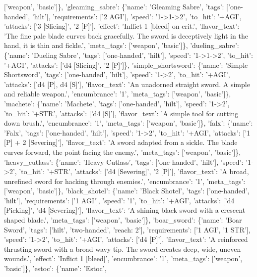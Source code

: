 \documentclass[
  letterpaper,
  DIV=11,
  numbers=noendperiod]{scrartcl}
\begin{document}
{{[}'weapon', 'basic'{]}\}, 'gleaming\_sabre': \{'name': 'Gleaming
Sabre', 'tags': {[}'one-handed', 'hilt'{]}, 'requirements': {[}'2
AGI'{]}, 'speed': '1-\textgreater1-\textgreater2', 'to\_hit': '+AGI',
'attacks': {[}'3 {[}Slicing{]}', '2 {[}P{]}'{]}, 'effect': 'Inflict 1
{[}bleed{]} on crit.', 'flavor\_text': 'The fine pale blade curves back
gracefully. The sword is deceptively light in the hand, it is thin and
fickle.', 'meta\_tags': {[}'weapon', 'basic'{]}\}, 'dueling\_sabre':
\{'name': 'Dueling Sabre', 'tags': {[}'one-handed', 'hilt'{]}, 'speed':
'1-\textgreater1-\textgreater2', 'to\_hit': '+AGI', 'attacks': {[}'d4
{[}Slicing{]}', '2 {[}P{]}'{]}\}, 'simple\_shortsword': \{'name':
'Simple Shortsword', 'tags': {[}'one-handed', 'hilt'{]}, 'speed':
'1-\textgreater2', 'to\_hit': '+AGI', 'attacks': {[}'d4 {[}P{]}, d4
{[}S{]}'{]}, 'flavor\_text': 'An unadorned straight sword. A simple and
reliable weapon.', 'encumbrance': '1', 'meta\_tags': {[}'weapon',
'basic'{]}\}, 'machete': \{'name': 'Machete', 'tags': {[}'one-handed',
'hilt'{]}, 'speed': '1-\textgreater2', 'to\_hit': '+STR', 'attacks':
{[}'d4 {[}S{]}'{]}, 'flavor\_text': 'A simple tool for cutting down
brush.', 'encumbrance': '1', 'meta\_tags': {[}'weapon', 'basic'{]}\},
'falx': \{'name': 'Falx', 'tags': {[}'one-handed', 'hilt'{]}, 'speed':
'1-\textgreater2', 'to\_hit': '+AGI', 'attacks': {[}'1 {[}P{]} + 2
{[}Severing{]}'{]}, 'flavor\_text': 'A sword adapted from a sickle. The
blade curves forward, the point facing the enemy.', 'meta\_tags':
{[}'weapon', 'basic'{]}\}, 'heavy\_cutlass': \{'name': 'Heavy Cutlass',
'tags': {[}'one-handed', 'hilt'{]}, 'speed': '1-\textgreater2',
'to\_hit': '+STR', 'attacks': {[}'d4 {[}Severing{]}', '2 {[}P{]}'{]},
'flavor\_text': 'A broad, unrefined sword for hacking through enemies.',
'encumbrance': '1', 'meta\_tags': {[}'weapon', 'basic'{]}\},
'black\_shotel': \{'name': 'Black Shotel', 'tags': {[}'one-handed',
'hilt'{]}, 'requirements': {[}'1 AGI'{]}, 'speed': '1', 'to\_hit':
'+AGI', 'attacks': {[}'d4 {[}Picking{]}', 'd4 {[}Severing{]}'{]},
'flavor\_text': 'A shining black sword with a crescent shaped blade.',
'meta\_tags': {[}'weapon', 'basic'{]}\}, 'boar\_sword': \{'name': 'Boar
Sword', 'tags': {[}'hilt', 'two-handed', 'reach: 2'{]}, 'requirements':
{[}'1 AGI', '1 STR'{]}, 'speed': '1-\textgreater2', 'to\_hit': '+AGI',
'attacks': {[}'d4 {[}P{]}'{]}, 'flavor\_text': 'A reinforced thrusting
sword with a broad wavy tip. The sword creates deep, wide, uneven
wounds.', 'effect': 'Inflict 1 {[}bleed{]}', 'encumbrance': '1',
'meta\_tags': {[}'weapon', 'basic'{]}\}, 'estoc': \{'name': 'Estoc',
}
\end{document}
